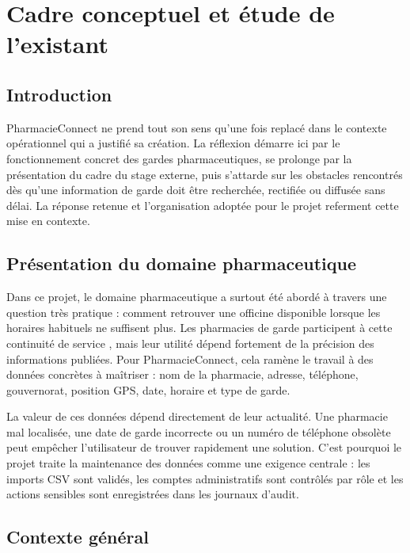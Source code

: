 \chapter{Cadre conceptuel et étude de l'existant}
\label{ch:cadre-conceptuel}
\minitoc
\clearpage

\section{Introduction}

PharmacieConnect ne prend tout son sens qu'une fois replacé dans le contexte opérationnel qui a justifié
sa création. La réflexion démarre ici par le fonctionnement concret des gardes pharmaceutiques, se prolonge
par la présentation du cadre du stage externe, puis s'attarde sur les obstacles rencontrés dès qu'une
information de garde doit être recherchée, rectifiée ou diffusée sans délai. La réponse retenue et
l'organisation adoptée pour le projet referment cette mise en contexte.

\section{Présentation du domaine pharmaceutique}

Dans ce projet, le domaine pharmaceutique a surtout été abordé à travers une question très pratique :
comment retrouver une officine disponible lorsque les horaires habituels ne suffisent plus. Les pharmacies
de garde participent à cette continuité de service \cite{cnopt_tableau_garde,cnopt_cropt_gardes}, mais leur
utilité dépend fortement de la précision des informations publiées. Pour PharmacieConnect, cela ramène le
travail à des données concrètes à maîtriser : nom de la pharmacie, adresse, téléphone, gouvernorat, position
GPS, date, horaire et type de garde.

La valeur de ces données dépend directement de leur actualité. Une pharmacie mal localisée, une date de
garde incorrecte ou un numéro de téléphone obsolète peut empêcher l'utilisateur de trouver rapidement une
solution. C'est pourquoi le projet traite la maintenance des données comme une exigence centrale : les
imports CSV sont validés, les comptes administratifs sont contrôlés par rôle et les actions sensibles sont
enregistrées dans les journaux d'audit.

\section{Contexte général}

